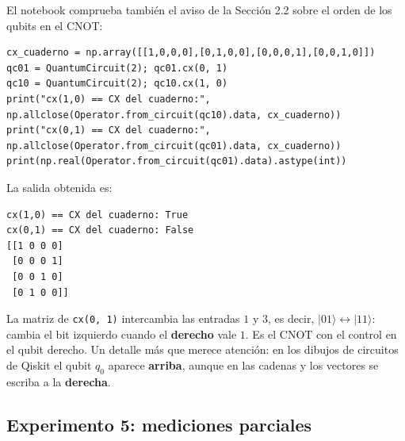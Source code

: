 \documentclass[11pt, a4paper, twoside, openright]{report}
\begin{document}
\noindent El notebook comprueba también el aviso de la Sección 2.2 sobre el orden de los qubits en el CNOT:
\begin{lstlisting}
cx_cuaderno = np.array([[1,0,0,0],[0,1,0,0],[0,0,0,1],[0,0,1,0]])
qc01 = QuantumCircuit(2); qc01.cx(0, 1)
qc10 = QuantumCircuit(2); qc10.cx(1, 0)
print("cx(1,0) == CX del cuaderno:", np.allclose(Operator.from_circuit(qc10).data, cx_cuaderno))
print("cx(0,1) == CX del cuaderno:", np.allclose(Operator.from_circuit(qc01).data, cx_cuaderno))
print(np.real(Operator.from_circuit(qc01).data).astype(int))
\end{lstlisting}
\noindent La salida obtenida es:
\begin{lstlisting}[language={}]
cx(1,0) == CX del cuaderno: True
cx(0,1) == CX del cuaderno: False
[[1 0 0 0]
 [0 0 0 1]
 [0 0 1 0]
 [0 1 0 0]]
\end{lstlisting}
\noindent La matriz de \texttt{cx(0, 1)} intercambia las entradas $1$ y $3$, es decir, $|01\rangle\leftrightarrow|11\rangle$: cambia el bit izquierdo cuando el \textbf{derecho} vale $1$. Es el CNOT con el control en el qubit derecho. Un detalle más que merece atención: en los dibujos de circuitos de Qiskit el qubit $q_0$ aparece \textbf{arriba}, aunque en las cadenas y los vectores se escriba a la \textbf{derecha}.

\subsection{Experimento 5: mediciones parciales}
\end{document}
